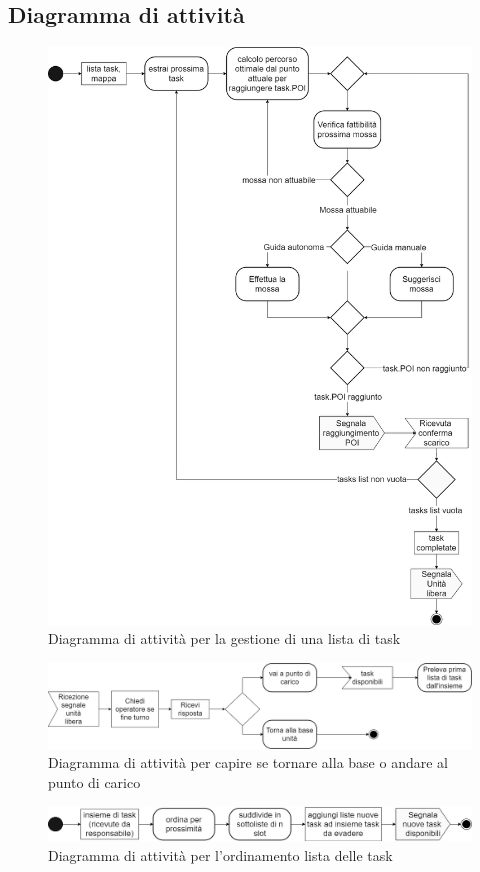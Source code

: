 \subsection{Diagramma di attività}
\begin{figure}[H]
	\centering
	\includegraphics[scale=0.3]{res/images/diagramma_di_attivita2.png}
	\caption{Diagramma di attività per la gestione di una lista di task}
\end{figure}
\begin{figure}[H]
	\centering
	\includegraphics[scale=0.3]{res/images/diagramma_di_attivita1.png}
	\caption{Diagramma di attività per capire se tornare alla base o andare al punto di carico}
\end{figure}
\begin{figure}[H]
	\centering
	\includegraphics[scale=0.3]{res/images/diagramma_di_attivita3.png}
	\caption{Diagramma di attività per l'ordinamento lista delle task}
\end{figure}


